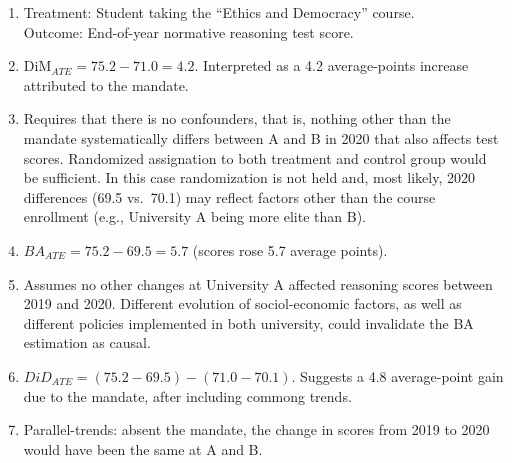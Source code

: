 \documentclass[11pt]{exam}
\begin{document}
\begin{questions}
\begin{solution}
\begin{enumerate}[label=(\alph*)]
    \item Treatment: Student taking the “Ethics and Democracy” course. \\  
    Outcome: End-of-year normative reasoning test score.
    \item $\displaystyle \text{DiM}_{ATE} = 75.2 - 71.0 = \boxed{4.2}.$  
    Interpreted as a 4.2 average-points increase attributed to the mandate.
    \item Requires that there is no confounders, that is, nothing other than the mandate systematically differs between A and B in 2020 that also affects test scores. Randomized assignation to both treatment and control group would be sufficient. In this case randomization is not held and, most likely, 2020 differences (69.5 vs.\ 70.1) may reflect factors other than the course enrollment (e.g., University A being more elite than B).
    \item $BA_{ATE} = 75.2 - 69.5 = \boxed{5.7}$ (scores rose 5.7 average points).
    \item Assumes no other changes at University A affected reasoning scores between 2019 and 2020. Different evolution of sociol-economic factors, as well as different policies implemented in both university, could invalidate the BA estimation as causal. 
    \item $DiD_{ATE} = (75.2 - 69.5) - (71.0 - 70.1)$. Suggests a 4.8 average-point gain due to the mandate, after including commong trends.
    \item Parallel-trends: absent the mandate, the change in scores from 2019 to 2020 would have been the same at A and B.
\end{enumerate}
\end{solution}

\end{questions}
\end{document}
